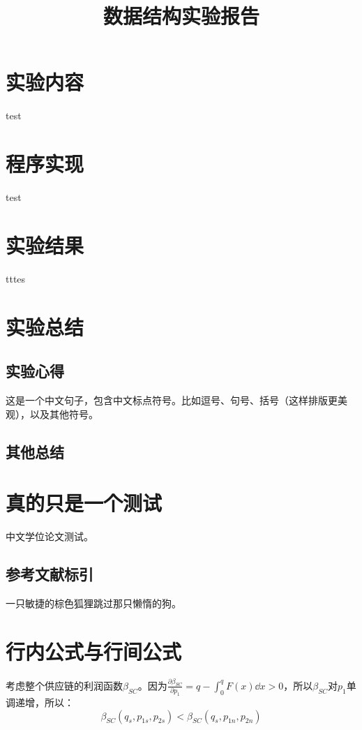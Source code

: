 \documentclass{csexp}
\begin{document}
\title{数据结构实验报告}


\makecover

\section{实验内容}
test

\section{程序实现}
test

\section{实验结果}
tttes

\section{实验总结}
\subsection{实验心得}
这是一个中文句子，包含中文标点符号。比如逗号、句号、括号（这样排版更美观），以及其他符号。

\subsection{其他总结}


\section{真的只是一个测试}

中文学位论文测试\cite{zhang2010tree}。

\subsection{参考文献标引}

一只敏捷的棕色狐狸跳过那只懒惰的狗\cite{deng:01a}。


\section{行内公式与行间公式}

考虑整个供应链的利润函数$\beta_{SC}$。因为$\frac{\partial\beta_{SC}}{\partial p_1}=q-\int_0^q F(x)\dd x>0$，所以$\beta_{SC}$对$p_1$单调递增，所以：
\begin{equation}
    \label{dscNoStgProof0}
    \beta_{SC}(q_s,p_{1s},p_{2s})<\beta_{SC}(q_s,p_{1n},p_{2n})
\end{equation}
\end{document}
